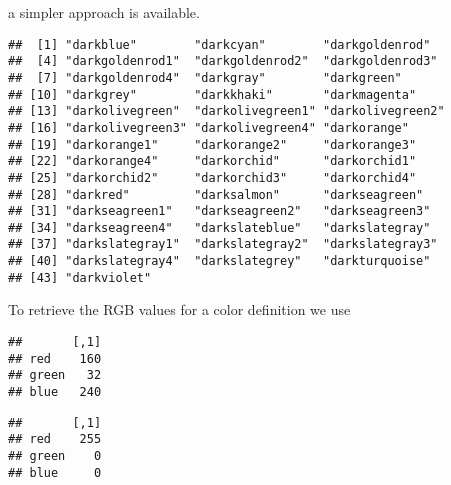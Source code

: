 \documentclass[krantz2]{krantz}\usepackage{knitr}%
\begin{document}
a simpler approach is available.

\begin{knitrout}\footnotesize
{}\color{fgcolor}\begin{kframe}
\begin{alltt}
\hlstd{(}\hlstd{,} \hlstd{(),}  \hlstd{=} \hlstd{)}
\end{alltt}
\begin{verbatim}
##  [1] "darkblue"        "darkcyan"        "darkgoldenrod"  
##  [4] "darkgoldenrod1"  "darkgoldenrod2"  "darkgoldenrod3" 
##  [7] "darkgoldenrod4"  "darkgray"        "darkgreen"      
## [10] "darkgrey"        "darkkhaki"       "darkmagenta"    
## [13] "darkolivegreen"  "darkolivegreen1" "darkolivegreen2"
## [16] "darkolivegreen3" "darkolivegreen4" "darkorange"     
## [19] "darkorange1"     "darkorange2"     "darkorange3"    
## [22] "darkorange4"     "darkorchid"      "darkorchid1"    
## [25] "darkorchid2"     "darkorchid3"     "darkorchid4"    
## [28] "darkred"         "darksalmon"      "darkseagreen"   
## [31] "darkseagreen1"   "darkseagreen2"   "darkseagreen3"  
## [34] "darkseagreen4"   "darkslateblue"   "darkslategray"  
## [37] "darkslategray1"  "darkslategray2"  "darkslategray3" 
## [40] "darkslategray4"  "darkslategrey"   "darkturquoise"  
## [43] "darkviolet"
\end{verbatim}
\end{kframe}
\end{knitrout}

To retrieve the RGB values for a color definition we use

\begin{knitrout}\footnotesize
{}\color{fgcolor}\begin{kframe}
\begin{alltt}
\hlstd{(}\hlstd{)}
\end{alltt}
\begin{verbatim}
##       [,1]
## red    160
## green   32
## blue   240
\end{verbatim}
\begin{alltt}
\hlstd{(}\hlstd{)}
\end{alltt}
\begin{verbatim}
##       [,1]
## red    255
## green    0
## blue     0
\end{verbatim}
\end{kframe}
\end{knitrout}
\end{document}
